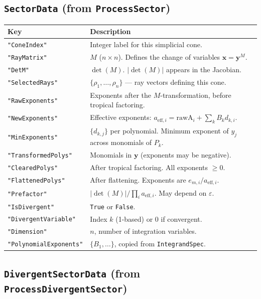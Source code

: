 \documentclass[11pt,a4paper]{article}
\begin{document}
\subsection{\texttt{SectorData} (from \texttt{ProcessSector})}\label{sec:sectordata}

\begin{center}
\begin{tabular}{lp{9cm}}
\toprule
\textbf{Key} & \textbf{Description} \\
\midrule
\texttt{"ConeIndex"} & Integer label for this simplicial cone. \\
\texttt{"RayMatrix"} & $M$ ($n \times n$). Defines the change of variables $\mathbf{x} = \mathbf{y}^M$. \\
\texttt{"DetM"} & $\det(M)$. $|\det(M)|$ appears in the Jacobian. \\
\texttt{"SelectedRays"} & $\{\rho_1, \ldots, \rho_n\}$ --- ray vectors defining this cone. \\
\texttt{"RawExponents"} & Exponents after the $M$-transformation, before tropical factoring. \\
\texttt{"NewExponents"} & Effective exponents: $a_{\mathrm{eff},i} = \mathrm{rawA}_i + \sum_k B_k d_{k,i}$. \\
\texttt{"MinExponents"} & $\{d_{k,j}\}$ per polynomial. Minimum exponent of $y_j$ across monomials of $P_k$. \\
\texttt{"TransformedPolys"} & Monomials in $\mathbf{y}$ (exponents may be negative). \\
\texttt{"ClearedPolys"} & After tropical factoring. All exponents $\geq 0$. \\
\texttt{"FlattenedPolys"} & After flattening. Exponents are $e_{m,i}/a_{\mathrm{eff},i}$. \\
\texttt{"Prefactor"} & $|\det(M)|/\prod_i a_{\mathrm{eff},i}$. May depend on $\varepsilon$. \\
\texttt{"IsDivergent"} & \texttt{True} or \texttt{False}. \\
\texttt{"DivergentVariable"} & Index $k$ (1-based) or 0 if convergent. \\
\texttt{"Dimension"} & $n$, number of integration variables. \\
\texttt{"PolynomialExponents"} & $\{B_1, \ldots\}$, copied from \texttt{IntegrandSpec}. \\
\bottomrule
\end{tabular}
\end{center}

\subsection{\texttt{DivergentSectorData} (from \texttt{ProcessDivergentSector})}
\end{document}
